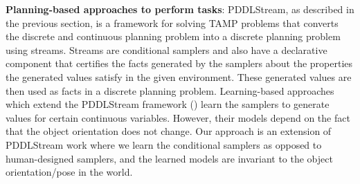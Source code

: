  
\textbf{Planning-based approaches to perform tasks}: PDDLStream, as described in the previous section, is a framework for solving TAMP problems that converts the discrete and continuous planning problem into a discrete planning problem using streams. Streams are conditional samplers and also have a declarative component that certifies the facts generated by the samplers about the properties the generated values satisfy in the given environment. These generated values are then used as facts in a discrete planning problem. Learning-based approaches which extend the PDDLStream framework (\cite{Learning_compositional_models}) learn the samplers to generate values for certain continuous variables. However, their models depend on the fact that the object orientation does not change. Our approach is an extension of PDDLStream work where we learn the conditional samplers as opposed to human-designed samplers, and the learned models are invariant to the object orientation/pose in the world. 



